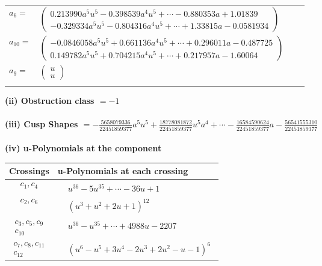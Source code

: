 \documentclass[1p]{elsarticle_modified}
\theoremstyle{definition}
\begin{document}
\begin{tabular}{m{7pt} m{180pt} m{7pt} m{180pt} }
\flushright $a_{6}=$&$\begin{pmatrix}0.213990 a^{5} u^{5}-0.398539 a^{4} u^{5}+\cdots-0.880353 a+1.01839\\-0.329334 a^{5} u^{5}-0.804316 a^{4} u^{5}+\cdots+1.33815 a-0.0581934\end{pmatrix}$ \\
\flushright $a_{10}=$&$\begin{pmatrix}-0.0846058 a^{5} u^{5}+0.661136 a^{4} u^{5}+\cdots+0.296011 a-0.487725\\0.149782 a^{5} u^{5}+0.704215 a^{4} u^{5}+\cdots+0.217957 a-1.60064\end{pmatrix}$ \\
\flushright $a_{9}=$&$\begin{pmatrix}u\\u\end{pmatrix}$\\&\end{tabular}
\flushleft \textbf{(ii) Obstruction class $= -1$}\\~\\
\flushleft \textbf{(iii) Cusp Shapes $= -\frac{5658079336}{22451859377} a^5 u^5+\frac{18778081872}{22451859377} u^5 a^4+\cdots-\frac{16584590624}{22451859377} a-\frac{56541555310}{22451859377}$}\\~\\
\newpage\renewcommand{\arraystretch}{1}
\flushleft \textbf{(iv) u-Polynomials at the component}\newline \\
\begin{tabular}{m{50pt}|m{274pt}}
Crossings & \hspace{64pt}u-Polynomials at each crossing \\
\hline $$\begin{aligned}c_{1},c_{4}\end{aligned}$$&$\begin{aligned}
&u^{36}-5 u^{35}+\cdots-36 u+1
\end{aligned}$\\
\hline $$\begin{aligned}c_{2},c_{6}\end{aligned}$$&$\begin{aligned}
&(u^3+u^2+2 u+1)^{12}
\end{aligned}$\\
\hline $$\begin{aligned}c_{3},c_{5},c_{9}\\c_{10}\end{aligned}$$&$\begin{aligned}
&u^{36}- u^{35}+\cdots+4988 u-2207
\end{aligned}$\\
\hline $$\begin{aligned}c_{7},c_{8},c_{11}\\c_{12}\end{aligned}$$&$\begin{aligned}
&(u^6- u^5+3 u^4-2 u^3+2 u^2- u-1)^6
\end{aligned}$\\
\hline
\end{tabular}\\~\\
\end{document}
